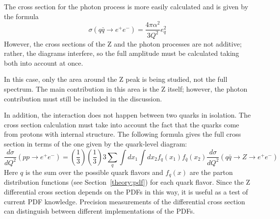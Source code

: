 






The cross section for the photon process 
is more easily calculated and is given by the formula
\[
\sigma(q \bar{q} \rightarrow e^+ e^-) 
= \frac{4 \pi \alpha^2}{3 Q^2} e_q^2
\]
However, the cross sections of the Z and the photon 
processes are not additive; 
rather, the diagrams interfere, 
so the full amplitude must be calculated taking 
both into account at once.  

In this case, only the area around the Z peak is being 
studied, not the full spectrum.  
The main contribution in this area is the Z itself; 
however, the photon contribution must still be included 
in the discussion.  

In addition, 
the interaction does not happen 
between two quarks in isolation.  
The cross section calculation must take 
into account the fact that the quarks come from 
protons with internal structure.  
The following formula gives the full cross section 
in terms of the one given by the quark-level diagram: 
\[
\frac{d \sigma}{d Q^2}(pp \rightarrow e^+ e^- )
= \left( \frac{1}{3} \right) \left( \frac{1}{3} \right) 3 
\sum_q \int dx_1 \int dx_2 f_q (x_1) f_{\bar{q}} (x_2)
\frac{d \sigma }{d Q^2}
( q \bar{q} \rightarrow Z \rightarrow e^+ e^- )
\]
Here $q$ is the sum over the possible quark flavors 
and $f_q(x)$ are the parton distribution functions 
(see Section~\ref{theory:pdf}) for each quark flavor.  
Since the Z differential cross section depends 
on the PDFs in this way, 
it is useful as a test of current PDF knowledge.  
Precision measurements of the differential cross section 
can distinguish between different implementations 
of the PDFs.  

